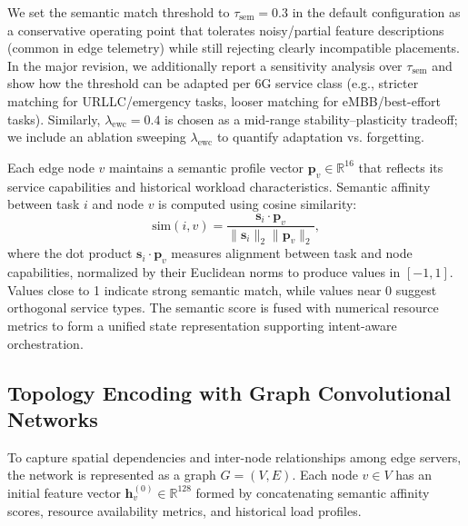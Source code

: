 We set the semantic match threshold to $\tau_{\text{sem}}=0.3$ in the default configuration as a conservative operating point that tolerates noisy/partial feature descriptions (common in edge telemetry) while still rejecting clearly incompatible placements. In the major revision, we additionally report a sensitivity analysis over $\tau_{\text{sem}}$ and show how the threshold can be adapted per 6G service class (e.g., stricter matching for URLLC/emergency tasks, looser matching for eMBB/best-effort tasks). Similarly, $\lambda_{\text{ewc}}=0.4$ is chosen as a mid-range stability--plasticity tradeoff; we include an ablation sweeping $\lambda_{\text{ewc}}$ to quantify adaptation vs. forgetting.

Each edge node $v$ maintains a semantic profile vector $\mathbf{p}_v \in \mathbb{R}^{16}$ that reflects its service capabilities and historical workload characteristics. Semantic affinity between task $i$ and node $v$ is computed using cosine similarity:
\begin{equation}
	\text{sim}(i,v) = \frac{\mathbf{s}_i \cdot \mathbf{p}_v}{\|\mathbf{s}_i\|_2 \|\mathbf{p}_v\|_2},
\end{equation}
where the dot product $\mathbf{s}_i \cdot \mathbf{p}_v$ measures alignment between task and node capabilities, normalized by their Euclidean norms to produce values in $[-1, 1]$. Values close to 1 indicate strong semantic match, while values near 0 suggest orthogonal service types. The semantic score is fused with numerical resource metrics to form a unified state representation supporting intent-aware orchestration.

\subsection{Topology Encoding with Graph Convolutional Networks}
To capture spatial dependencies and inter-node relationships among edge servers, the network is represented as a graph $G = (V, E)$. Each node $v \in V$ has an initial feature vector $\mathbf{h}_v^{(0)} \in \mathbb{R}^{128}$ formed by concatenating semantic affinity scores, resource availability metrics, and historical load profiles.

